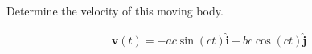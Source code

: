 Determine the velocity of this moving body.

\begin{solution}
\begin{align*}
    \boldsymbol{v}(t) = -ac\sin(ct) \hat{\boldsymbol{i}} + bc\cos(ct) \hat{\boldsymbol{j}}
\end{align*}
\end{solution}